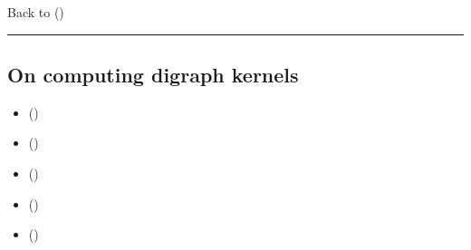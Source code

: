 \documentclass[a4paper,12pt,english]{sphinxhowto}
\begin{document}
\sphinxAtStartPar
Back to {\hyperref[\detokenize{pearls:pearls-label}]{}} ()


\bigskip\hrule\bigskip



\subsection{On computing digraph kernels}
\label{\detokenize{pearls:on-computing-digraph-kernels}}\label{\detokenize{pearls:kernel-tutorial-label}}
\begin{sphinxcontents}
\begin{itemize}
\item {} 
\sphinxAtStartPar
{}\label{\detokenize{pearls:id154}}{\hyperref[\detokenize{pearls:what-is-a-graph-kernel}]{}} ()

\item {} 
\sphinxAtStartPar
{}\label{\detokenize{pearls:id155}}{\hyperref[\detokenize{pearls:initial-and-terminal-kernels}]{}} ()

\item {} 
\sphinxAtStartPar
{}\label{\detokenize{pearls:id156}}{\hyperref[\detokenize{pearls:kernels-in-lateralized-digraphs}]{}} ()

\item {} 
\sphinxAtStartPar
{}\label{\detokenize{pearls:id157}}{\hyperref[\detokenize{pearls:computing-first-and-last-choice-recommendations}]{}} ()

\item {} 
\sphinxAtStartPar
{}\label{\detokenize{pearls:id158}}{\hyperref[\detokenize{pearls:tractability}]{}} ()

\end{itemize}
\end{sphinxcontents}
\end{document}

